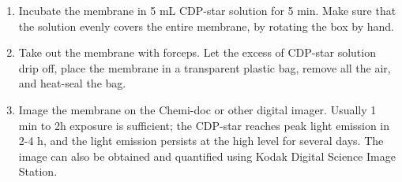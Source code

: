 \documentclass{article}
\begin{document}
\begin{enumerate}[resume]
\item Incubate the membrane in 5 mL CDP-star solution for 5 min. Make sure that the solution evenly covers the entire membrane, by rotating the box by hand. 
\item Take out the membrane with forceps. Let the excess of CDP-star solution drip off, place the membrane in a transparent plastic bag, remove all the air, and heat-seal
the bag. 
\item Image the membrane on the Chemi-doc or other digital imager. Usually 1 min to 2h exposure is sufficient; the CDP-star reaches peak light emission in 2-4 h, and the light emission persists at the high level for several days. The image can also be obtained and quantified using Kodak Digital Science Image Station.
\end{enumerate}

\end{document}
